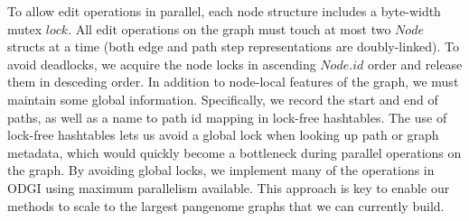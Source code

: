 \documentclass{bioinfo}
\begin{document}
To allow edit operations in parallel, each node structure includes a byte-width mutex $lock$.
All edit operations on the graph must touch at most two $Node$ structs at a time (both edge and path step representations are doubly-linked).
To avoid deadlocks, we acquire the node locks in ascending $Node.id$ order and release them in desceding order.
In addition to node-local features of the graph, we must maintain some global information.
Specifically, we record the start and end of paths, as well as a name to path id mapping in lock-free hashtables.
The use of lock-free hashtables lets us avoid a global lock when looking up path or graph metadata, which would quickly become a bottleneck during parallel operations on the graph.
By avoiding global locks, we implement many of the operations in ODGI using maximum parallelism available.
This approach is key to enable our methods to scale to the largest pangenome graphs that we can currently build.


\begin{comment}
key message of the paper is that we have collected a set of algorithms that enable easy use of pangenome graphs for investigating biology
-> build model solves problem of working with big graphs in memory
-> view (convert to GFA) & paths solve problem of exporting basic features of the graph (e.g. paths)
-> stats (understand basic size / structure) & bin & degree & depth solves problem of understanding the overall structure and size of the graph
-> sort (groom) & layout solves problem of finding latent structure in the pangenome
-> viz & draw provides a human-viewable readout of the graph
-> chop & unchop & squeeze & break & prune & explode lets us break apart or combine the graph nodes and topology
-> position & tips & untangle (jaccard based coordinate conversion) provides a way to map coordinates between any genomes in the graph (e.g. liftover!)
-> extract lets us pull out specific regions of the graph based on path ranges, nodes and positions
\end{comment}
\end{document}
